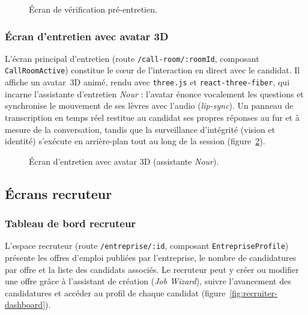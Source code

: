 \begin{figure}[H]
  \centering
  \caption{Écran de vérification pré-entretien.}
  \label{fig:pre-interview}
\end{figure}

\subsubsection{Écran d'entretien avec avatar 3D}

L'écran principal d'entretien (route \texttt{/call-room/:roomId}, composant
\texttt{CallRoomActive}) constitue le cœur de l'interaction en direct avec le candidat. Il
affiche un avatar~3D animé, rendu avec \texttt{three.js} et \texttt{react-three-fiber}, qui
incarne l'assistante d'entretien \textit{Nour} : l'avatar énonce vocalement les questions et
synchronise le mouvement de ses lèvres avec l'audio (\textit{lip-sync}). Un panneau de
transcription en temps réel restitue au candidat ses propres réponses au fur et à mesure de
la conversation, tandis que la surveillance d'intégrité (vision et identité) s'exécute en
arrière-plan tout au long de la session (figure~\ref{fig:interview-avatar}).

\begin{figure}[H]
  \centering
  \caption{Écran d'entretien avec avatar 3D (assistante \textit{Nour}).}
  \label{fig:interview-avatar}
\end{figure}

\subsection{Écrans recruteur}

\subsubsection{Tableau de bord recruteur}

L'espace recruteur (route \texttt{/entreprise/:id}, composant \texttt{EntrepriseProfile})
présente les offres d'emploi publiées par l'entreprise, le nombre de candidatures par offre
et la liste des candidats associés. Le recruteur peut y créer ou modifier une offre grâce à
l'assistant de création (\textit{Job Wizard}), suivre l'avancement des candidatures et
accéder au profil de chaque candidat (figure~\ref{fig:recruiter-dashboard}).

